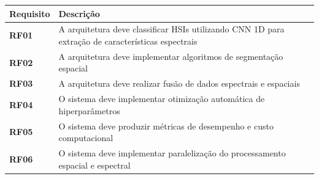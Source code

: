 \begin{quadro}[H]
    \centering
    \caption{Requisitos funcionais}
    \begin{tabular}{|p{}|p{}|}
        \hline
        \rowcolor[HTML]{C0C0C0}
        \textbf{Requisito} & \textbf{Descrição}  \\
        \hline
        
        \textbf{RF01} & A arquitetura deve classificar HSIs utilizando CNN 1D para extração de características espectrais \\ 
        \hline

        \textbf{RF02} & A arquitetura deve implementar algoritmos de segmentação espacial \\
        \hline

        \textbf{RF03} & A arquitetura deve realizar fusão de dados espectrais e espaciais \\
        \hline
        
        \textbf{RF04} & O sistema deve implementar otimização automática de hiperparâmetros \\
        \hline

        \textbf{RF05} & O sistema deve produzir métricas de desempenho e custo computacional \\
        \hline
        
        \textbf{RF06} & O sistema deve implementar paralelização do processamento espacial e espectral \\
        \hline
    \end{tabular}
    \label{tab:rf}
\end{quadro}

